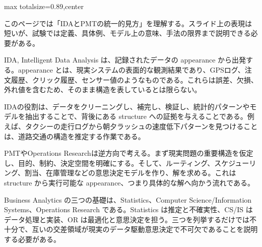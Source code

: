\begin{minipage}[t]{0.58\textwidth}
\begin{adjustbox}{max totalsize={\textwidth}{0.89\textheight},center}
\begin{minipage}{\textwidth}\scriptsize
{}このページでは「IDAとPMTの統一的見方」を理解する。スライド上の表現は短いが、試験では定義、具体例、モデル上の意味、手法の限界まで説明できる必要がある。\par
IDA, Intelligent Data Analysis は、記録されたデータの appearance から出発する。appearance とは、現実システムの表面的な観測結果であり、GPSログ、注文履歴、クリック履歴、センサー値のようなものである。これらは誤差、欠損、外れ値を含むため、そのまま構造を表しているとは限らない。\par
IDAの役割は、データをクリーニングし、補完し、検証し、統計的パターンやモデルを抽出することで、背後にある structure への証拠を与えることである。例えば、タクシーの走行ログから朝夕ラッシュの速度低下パターンを見つけることは、道路交通の構造を推定する作業である。\par
PMTやOperations Researchは逆方向で考える。まず現実問題の重要構造を仮定し、目的、制約、決定空間を明確にする。そして、ルーティング、スケジューリング、割当、在庫管理などの意思決定モデルを作り、解を求める。これは structure から実行可能な appearance、つまり具体的な解へ向かう流れである。\par
Business Analytics の三つの基礎は、Statistics、Computer Science/Information Systems、Operations Research である。Statistics は推定と不確実性、CS/IS はデータ処理と実装、OR は最適化と意思決定を担う。三つを列挙するだけでは不十分で、互いの交差領域が現実のデータ駆動意思決定で不可欠であることを説明する必要がある。\par

\end{minipage}
\end{adjustbox}
\end{minipage}
